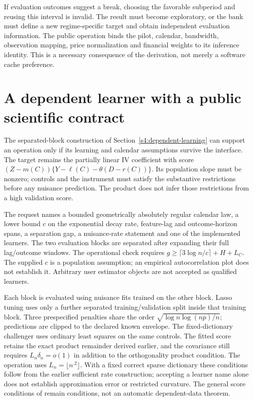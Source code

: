 If evaluation outcomes suggest a break, choosing the favorable subperiod and
reusing this interval is invalid. The result must become exploratory, or
the bank must define a new regime-specific target and obtain independent
evaluation information. The public operation binds the pilot, calendar,
bandwidth, observation mapping, price normalization and financial weights
to its inference identity. This is a necessary consequence of the derivation,
not merely a software cache preference.


\section{A dependent learner with a public scientific contract}
\label{c7:blocked-operation}
The separated-block construction of Section~\ref{s4:dependent-learning}
can support an operation only if its learning and calendar assumptions survive
the interface. The target remains the partially linear IV coefficient with
score $(Z-m(C))\{Y-\ell(C)-\theta(D-r(C))\}$. Its population slope must be
nonzero; controls and the instrument must satisfy the substantive restrictions
before any nuisance prediction. The product does not infer those restrictions
from a high validation score.

The request names a bounded geometrically absolutely regular calendar law,
a lower bound $c$ on the exponential decay rate, feature-lag and outcome-horizon
spans, a separation gap, a nuisance-rate statement and one of the implemented
learners. The two evaluation blocks are separated after expanding their full
lag/outcome windows. The operational check requires
$g\ge\lceil3\log n/c\rceil+H+L_C$. The supplied $c$ is a population
assumption; an empirical autocorrelation plot does not establish it. Arbitrary
user estimator objects are not accepted as qualified learners.

Each block is evaluated using nuisance fits trained on the other block. Lasso
tuning uses only a further separated training/validation split inside that
training block. Three prespecified penalties share the order
$\sqrt{\log n\log(np)/n}$; predictions are clipped to the declared known
envelope. The fixed-dictionary challenger uses ordinary least squares on the
same controls. The fitted score retains the exact product remainder derived
earlier, and the covariance still requires $L_n\delta_n=o(1)$ in addition to
the orthogonality product condition. The operation uses $L_n=\lfloor n^{.2}\rfloor$.
With a fixed correct sparse dictionary these conditions follow from the
earlier sufficient rate construction; accepting a learner name alone does
not establish approximation error or restricted curvature. The general score
conditions of \citet[Assumptions 3.1--3.2]{dml2018} remain conditions, not an
automatic dependent-data theorem.

